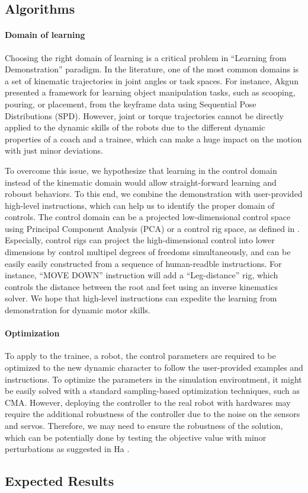 \subsection{Algorithms}

\paragraph{Domain of learning}

Choosing the right domain of learning is a critical problem 
in ``Learning from Demonstration'' paradigm.
In the literature, one of the most common domains is a set of kinematic
trajectories in joint angles or task spaces.
For instance, Akgun \etal \cite{Akgun:2011:KLD} presented a framework
for learning object manipulation tasks, such as scooping, pouring, or 
placement, from the keyframe data using Sequential Pose Distributions (SPD).
However, joint or torque trajectories cannot be directly applied to the
dynamic skills of the robots  due to the different dynamic properties 
of a coach and a trainee, which can make a huge impact on the motion
with just minor deviations.

To overcome this issue, we hypothesize that learning in the control domain
instead of the kinematic domain would allow straight-forward learning and
roboust behaviors.
To this end, we combine the demonstration with user-provided high-level
instructions, which can help us to identify the proper domain of controls.
The control domain can be a projected low-dimensional control space using
Principal Component Analysis (PCA) or a control rig space, as defined
in \cite{Ha:2014:ITD}.
Especially, control rigs can project the high-dimensional control into
lower dimensions by control multipel degrees of freedoms simultaneously,
and can be easily  easily constructed from a sequence of human-readble 
instructions.
For instance, ``MOVE DOWN'' instruction will add a ``Leg-distance'' rig,
which controls the distance between the root and feet using an inverse
kinematics solver.
We hope that high-level instructions can expedite the learning from
demonstration for dynamic motor skills.

\paragraph{Optimization}

To apply to the trainee, a robot, the control parameters are required to be
optimized to the new dynamic character to follow the user-provided 
examples and instructions.
To optimize the parameters in the simulation environtment, 
it might be easily solved with a standard sampling-based optimization
techniques, such as CMA.
However, deploying the controller to the real robot with hardwares
may require the additional robustness of the controller
due to the noise on the sensors and servos.
Therefore, we may need to ensure the robustness of the solution,
which can be potentially done by  testing the objective value 
with minor perturbations as suggested in Ha \etal \cite{Ha:2013:PSB}.

\subsection{Expected Results}
